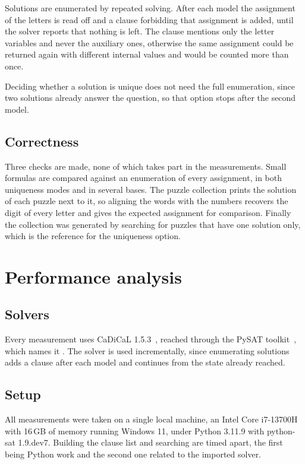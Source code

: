 \documentclass[11pt,a4paper]{article}
\begin{document}
Solutions are enumerated by repeated solving. After each model the assignment
of the letters is read off and a clause forbidding that assignment is added,
until the solver reports that nothing is left. The clause mentions only the
letter variables and never the auxiliary ones, otherwise the same assignment
could be returned again with different internal values and would be counted
more than once.

Deciding whether a solution is unique does not need the full enumeration,
since two solutions already answer the question, so that option stops after
the second model.

\subsection*{Correctness}

Three checks are made, none of which takes part in the measurements. Small
formulas are compared against an enumeration of every assignment, in both
uniqueness modes and in several bases. The puzzle collection prints the
solution of each puzzle next to it, so aligning the words with the numbers
recovers the digit of every letter and gives the expected assignment for
comparison. Finally the collection was generated by searching for puzzles that
have one solution only, which is the reference for the uniqueness option.

\section{Performance analysis}

\subsection*{Solvers}

Every measurement uses CaDiCaL 1.5.3~\cite{cadical}, reached through the PySAT
toolkit~\cite{pysat}, which names it . The solver is
used incrementally, since enumerating solutions adds a clause after each model
and continues from the state already reached.

\subsection*{Setup}

All measurements were taken on a single local machine, an Intel Core
i7-13700H with 16\,GB of memory running Windows 11, under Python 3.11.9
with python-sat 1.9.dev7. Building the clause list and searching are timed
apart, the first being Python work and the second one related to the imported solver.
\end{document}
